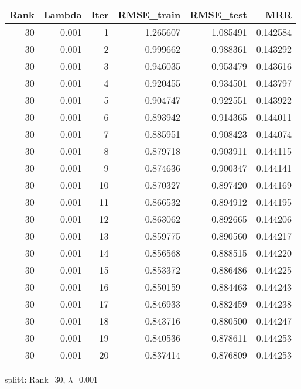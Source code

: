 \begin{tabular}{rrrrrr}
\toprule
 Rank &  Lambda &  Iter &  RMSE\_train &  RMSE\_test &       MRR \\
\midrule
   30 &   0.001 &     1 &    1.265607 &   1.085491 &  0.142584 \\
   30 &   0.001 &     2 &    0.999662 &   0.988361 &  0.143292 \\
   30 &   0.001 &     3 &    0.946035 &   0.953479 &  0.143616 \\
   30 &   0.001 &     4 &    0.920455 &   0.934501 &  0.143797 \\
   30 &   0.001 &     5 &    0.904747 &   0.922551 &  0.143922 \\
   30 &   0.001 &     6 &    0.893942 &   0.914365 &  0.144011 \\
   30 &   0.001 &     7 &    0.885951 &   0.908423 &  0.144074 \\
   30 &   0.001 &     8 &    0.879718 &   0.903911 &  0.144115 \\
   30 &   0.001 &     9 &    0.874636 &   0.900347 &  0.144141 \\
   30 &   0.001 &    10 &    0.870327 &   0.897420 &  0.144169 \\
   30 &   0.001 &    11 &    0.866532 &   0.894912 &  0.144195 \\
   30 &   0.001 &    12 &    0.863062 &   0.892665 &  0.144206 \\
   30 &   0.001 &    13 &    0.859775 &   0.890560 &  0.144217 \\
   30 &   0.001 &    14 &    0.856568 &   0.888515 &  0.144220 \\
   30 &   0.001 &    15 &    0.853372 &   0.886486 &  0.144225 \\
   30 &   0.001 &    16 &    0.850159 &   0.884463 &  0.144243 \\
   30 &   0.001 &    17 &    0.846933 &   0.882459 &  0.144238 \\
   30 &   0.001 &    18 &    0.843716 &   0.880500 &  0.144247 \\
   30 &   0.001 &    19 &    0.840536 &   0.878611 &  0.144253 \\
   30 &   0.001 &    20 &    0.837414 &   0.876809 &  0.144253 \\
\bottomrule
\end{tabular}

\caption{split4: Rank=30, $\lambda$=0.001}
